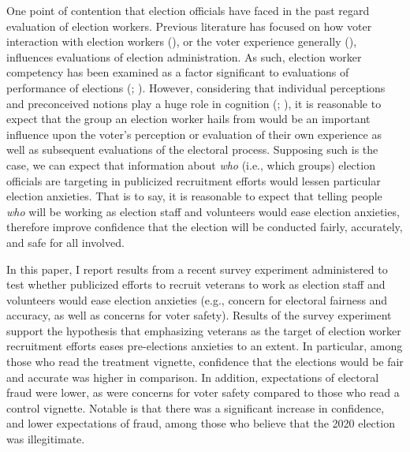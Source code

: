 \documentclass[
  11pt,
  a4paper,
]{scrartcl}
\begin{document}
One point of contention that election officials have faced in the past
regard evaluation of election workers. Previous literature has focused
on how voter interaction with election workers
(), or the voter
experience generally (), influences evaluations of election administration. As such,
election worker competency has been examined as a factor significant to
evaluations of performance of elections (; ). However, considering that individual
perceptions and preconceived notions play a huge role in cognition
(;
), it is
reasonable to expect that the group an election worker hails from would
be an important influence upon the voter's perception or evaluation of
their own experience as well as subsequent evaluations of the electoral
process. Supposing such is the case, we can expect that information
about \emph{who} (i.e., which groups) election officials are targeting
in publicized recruitment efforts would lessen particular election
anxieties. That is to say, it is reasonable to expect that telling
people \emph{who} will be working as election staff and volunteers would
ease election anxieties, therefore improve confidence that the election
will be conducted fairly, accurately, and safe for all involved.

In this paper, I report results from a recent survey experiment
administered to test whether publicized efforts to recruit veterans to
work as election staff and volunteers would ease election anxieties
(e.g., concern for electoral fairness and accuracy, as well as concerns
for voter safety). Results of the survey experiment support the
hypothesis that emphasizing veterans as the target of election worker
recruitment efforts eases pre-elections anxieties to an extent. In
particular, among those who read the treatment vignette, confidence that
the elections would be fair and accurate was higher in comparison. In
addition, expectations of electoral fraud were lower, as were concerns
for voter safety compared to those who read a control vignette. Notable
is that there was a significant increase in confidence, and lower
expectations of fraud, among those who believe that the 2020 election
was illegitimate.
\end{document}
